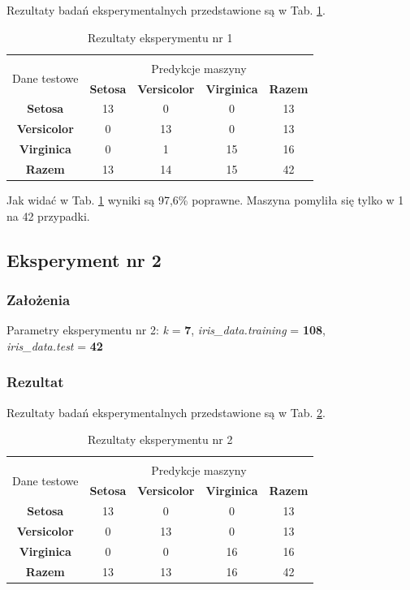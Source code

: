 \documentclass[12pt]{article}
\begin{document}
Rezultaty badań eksperymentalnych przedstawione są w Tab. \ref{wyniki1}.
\begin{table}[ht!]
 \centering
 \vspace{0.2cm}
 \begin{tabular}{|*{5}{c|}}
  \hline\\[-0.5cm]
   \multirow{2}{*}{Dane testowe} & \multicolumn{4}{c|}{Predykcje maszyny} \\ \cline{2-5}
   & \textbf{Setosa} & \textbf{Versicolor} & \textbf{Virginica} & \textbf{Razem}\\
  \hline
   \textbf{Setosa} & 13 & 0 & 0 & 13  \\ \hline
   \textbf{Versicolor} & 0 & 13 & 0 & 13  \\ \hline
   \textbf{Virginica} & 0 &  1 & 15 & 16  \\ \hline
   \textbf{Razem} & 13 & 14 & 15 & 42 \\
  \hline
 \end{tabular}
 \caption{Rezultaty eksperymentu nr 1}
 \label{wyniki1}
\end{table}

\noindent Jak widać w Tab. \ref{wyniki1} wyniki są 97,6\% poprawne. Maszyna pomyliła się tylko w 1 na 42 przypadki. \newline

\subsection{Eksperyment nr 2}
\subsubsection{Założenia}

Parametry eksperymentu nr 2: \textit{k} = \textbf{7}, \textit{iris\_data.training} = \textbf{108}, \\ \textit{iris\_data.test} = \textbf{42}

\subsubsection{Rezultat}

Rezultaty badań eksperymentalnych przedstawione są w Tab. \ref{wyniki2}.
\begin{table}[ht!]
 \centering
 \vspace{0.2cm}
  \begin{tabular}{|*{5}{c|}}
  \hline\\[-0.5cm]
   \multirow{2}{*}{Dane testowe} & \multicolumn{4}{c|}{Predykcje maszyny} \\ \cline{2-5}
   & \textbf{Setosa} & \textbf{Versicolor} & \textbf{Virginica} & \textbf{Razem}\\
  \hline
   \textbf{Setosa} & 13 & 0 & 0 & 13  \\ \hline
   \textbf{Versicolor} & 0 & 13 & 0 & 13  \\ \hline
   \textbf{Virginica} & 0 &  0 & 16 & 16  \\ \hline
   \textbf{Razem} & 13 & 13 & 16 & 42 \\
  \hline
 \end{tabular} 
 \caption{Rezultaty eksperymentu nr 2}
 \label{wyniki2}
\end{table}
\end{document}
